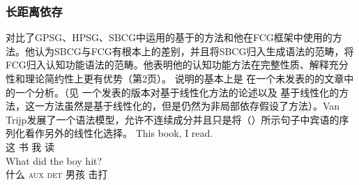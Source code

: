 \subsubsection{长距离依存}
\label{sec-fcg-nld}

 对比了GPSG、HPSG、SBCG中运用的基于\slaschc 的方法和他在FCG框架中使用的方法。他认为SBCG与FCG有根本上的差别，并且将SBCG归入生成语法的范畴，将FCG归入认知功能语法的范畴。他表明他的认知功能方法在完整性质、解释充分性和理论简约性上更有优势（第2页）。 \citet{vanTrijp2014a}说明的基本上是 \citet{Reape2000a}在一个未发表的的文章中的一个分析。（见 一个发表的版本对基于线性化方法的论述以及 基于线性化的方法，这一方法虽然是基于线性化的，但是仍然为非局部依存假设了\slaschc 方法）。Van Trijp发展了一个语法模型，允许不连续成分并且只是将（）所示句子中宾语的序列化看作另外的线性化选择。
\eal
\ex 
\gll This book, I read.\\  
    这 书 我 读\\
\ex 
\gll What did the boy hit?\\  
    什么 \textsc{aux} \textsc{det} 男孩 击打\\
